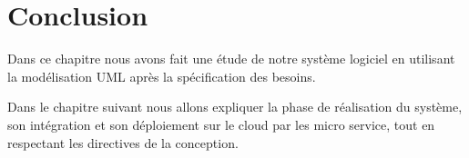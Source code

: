    
   
 
   
   
   
   
   
   
   
   \section{Conclusion}
   
   Dans ce chapitre nous avons fait une étude de notre système logiciel en utilisant la modélisation UML après la spécification des besoins.
   
     Dans le chapitre suivant nous allons expliquer la phase de réalisation du système, son intégration et son déploiement sur le  cloud par les micro service, tout en respectant les directives de la conception.
    
   